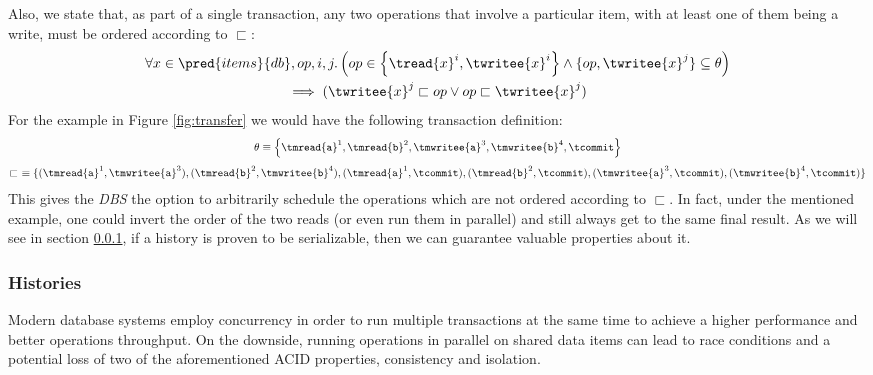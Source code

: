 Also, we state that, as part of a single transaction, any two operations that involve a particular item, with at least one of them being a write, must be ordered according to $\sqsubset$:
\begin{gather*}
	\forall x \in \pred{items}{db}, op, i, j \ldotp \left( op \in \left\lbrace \tread{x}^i, \twritee{x}^i \right\rbrace \land \lbrace op, \twritee{x}^j \rbrace \subseteq \theta \right) \\ \implies (\twritee{x}^j \sqsubset op \lor op \sqsubset \twritee{x}^j)
\end{gather*}
For the example in Figure \ref{fig:transfer} we would have the following transaction definition:
\begin{gather*}
\theta \equiv \left\lbrace \tmread{\texttt{a}}^1, \tmread{\texttt{b}}^2, \tmwritee{\texttt{a}}^3, \tmwritee{\texttt{b}}^4, \tcommit \right\rbrace
\\[0.4em]
\sqsubset\ \equiv \{ (\tmread{\texttt{a}}^1, \tmwritee{\texttt{a}}^3), (\tmread{\texttt{b}}^2, \tmwritee{\texttt{b}}^4), (\tmread{\texttt{a}}^1, \tcommit), (\tmread{\texttt{b}}^2, \tcommit), (\tmwritee{\texttt{a}}^3, \tcommit), (\tmwritee{\texttt{b}}^4, \tcommit) \}
\end{gather*}
This gives the \textit{DBS} the option to arbitrarily schedule the operations which are not ordered according to $\sqsubset$. In fact, under the mentioned example, one could invert the order of the two reads (or even run them in parallel) and still always get to the same final result. As we will see in section \ref{histories}, if a history is proven to be serializable, then we can guarantee valuable properties about it.

\tocless\subsubsection{Histories} \label{histories}

Modern database systems employ concurrency in order to run multiple transactions at the same time to achieve a higher performance and better operations throughput. On the downside, running operations in parallel on shared data items can lead to race conditions and a potential loss of two of the aforementioned ACID properties, consistency and isolation.

